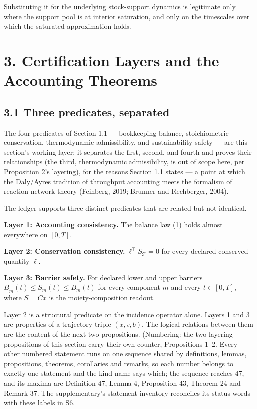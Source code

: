 \documentclass[11pt]{article}
\begin{document}
Substituting it for the underlying stock-support dynamics is legitimate only where the support pool is at interior saturation, and only on the timescales over which the saturated approximation holds.

\vspace{0.8em}

\section*{3. Certification Layers and the Accounting Theorems}\label{3-certification-layers-and-the-accounting-theorems}

\subsection*{3.1 Three predicates, separated}\label{31-three-predicates-separated}

The four predicates of Section 1.1 --- bookkeeping balance, stoichiometric conservation, thermodynamic admissibility, and sustainability safety --- are this section's working layer: it separates the first, second, and fourth and proves their relationships (the third, thermodynamic admissibility, is out of scope here, per Proposition 2's layering), for the reasons Section 1.1 states --- a point at which the Daly/\allowbreak{}Ayres tradition of throughput accounting meets the formalism of reaction-network theory (Feinberg, 2019; Brunner and Rechberger, 2004).

The ledger supports three distinct predicates that are related but not identical.

\textbf{Layer 1: Accounting consistency.} The balance law (1) holds almost everywhere on \([0,T]\).

\textbf{Layer 2: Conservation consistency.} \(\ell^\top S_{\mathcal{T}} = 0\) for every declared conserved quantity \(\ell\).

\textbf{Layer 3: Barrier safety.} For declared lower and upper barriers \(\underline{B}_m(t) \le S_m(t) \le \overline{B}_m(t)\) for every component \(m\) and every \(t \in [0,T]\), where \(S = Cx\) is the moiety-composition readout.

Layer 2 is a structural predicate on the incidence operator alone. Layers 1 and 3 are properties of a trajectory triple \((x, v, b)\). The logical relations between them are the content of the next two propositions. (Numbering: the two layering propositions of this section carry their own counter, Propositions 1--2. Every other numbered statement runs on one sequence shared by definitions, lemmas, propositions, theorems, corollaries and remarks, so each number belongs to exactly one statement and the kind name says which; the sequence reaches 47, and its maxima are Definition 47, Lemma 4, Proposition 43, Theorem 24 and Remark 37. The supplementary's statement inventory reconciles its status words with these labels in S6.
\end{document}
